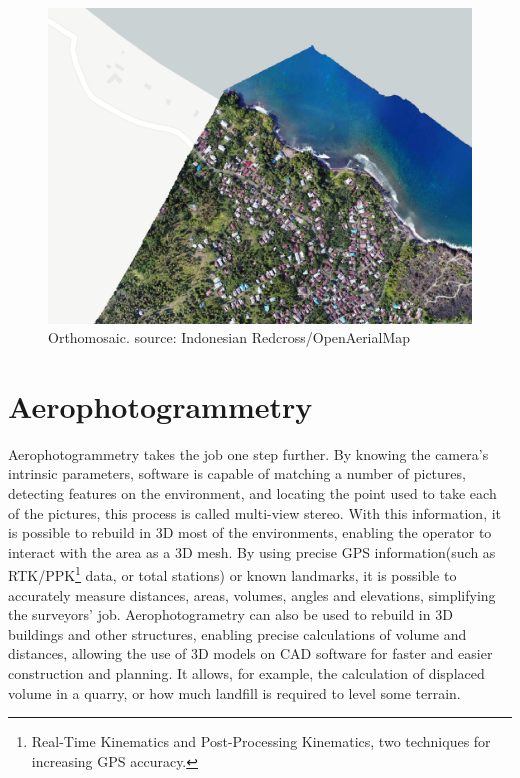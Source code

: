 \begin{figure}
\centering
  \includegraphics[width=\linewidth]{figs/orthomosaic.png}
  \caption{Orthomosaic. source: Indonesian Redcross/OpenAerialMap}
  \label{fig:orthomosaic}
\end{figure}


\section{Aerophotogrammetry}

Aerophotogrammetry takes the job one step further. 
%
By knowing the camera's intrinsic parameters, software is capable of matching a number of pictures, detecting features on the environment, and locating the point used to take each of the pictures, this process is called multi-view stereo. 
%
With this information, it is possible to rebuild in 3D most of the environments, enabling the operator to interact with the area as a 3D mesh.
%
By using precise GPS information(such as RTK/PPK\footnote{Real-Time Kinematics and Post-Processing Kinematics, two techniques for increasing GPS accuracy.} data, or total stations) or known landmarks, it is possible to accurately measure distances, areas, volumes, angles and elevations, simplifying the surveyors' job.
%
Aerophotogrametry can also be used to rebuild in 3D buildings and other structures, enabling precise calculations of volume and distances, allowing the use of 3D models on CAD software for faster and easier construction and planning.
%
It allows, for example, the calculation of displaced volume in a quarry, or how much landfill is required to level some terrain.
%

